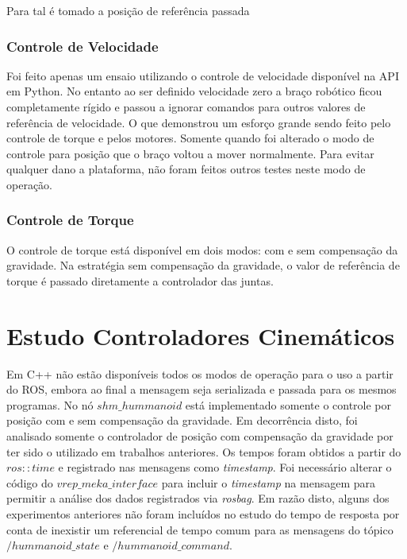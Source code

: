 Para tal é tomado a posição de referência passada

\subsubsection{Controle de Velocidade}

Foi feito apenas um ensaio utilizando o controle de velocidade disponível na API em Python. No entanto ao ser definido velocidade zero a braço robótico ficou completamente rígido e passou a ignorar comandos para outros valores de referência de velocidade. O que demonstrou um esforço grande sendo feito pelo controle de torque e pelos motores. Somente quando foi alterado o modo de controle para posição que o braço voltou a mover normalmente. Para evitar qualquer dano a plataforma, não foram feitos outros testes neste modo de operação.


\subsubsection{Controle de Torque}

O controle de torque está disponível em dois modos: com e sem compensação da gravidade. Na estratégia sem compensação da gravidade, o valor de referência de torque é passado diretamente a controlador das juntas.


\section{Estudo Controladores Cinemáticos}

Em C++ não estão disponíveis todos os modos de operação para o uso a partir do ROS, embora ao final a mensagem seja serializada e passada para os mesmos programas. No nó $shm\_hummanoid$ está implementado somente o controle por posição com e sem compensação da gravidade. Em decorrência disto, foi analisado somente o controlador de posição com compensação da gravidade por ter sido o utilizado em trabalhos anteriores. Os tempos foram obtidos a partir do $ros::time$ e registrado nas mensagens como \textit{timestamp}. Foi necessário alterar o código do $vrep\_meka\_interface$ para incluir o \textit{timestamp} na mensagem para permitir a análise dos dados registrados via \textit{rosbag}. Em razão disto, alguns dos experimentos anteriores não foram incluídos no estudo do tempo de resposta por conta de inexistir um referencial de tempo comum para as mensagens do tópico $/hummanoid\_state$ e $/hummanoid\_command$.

